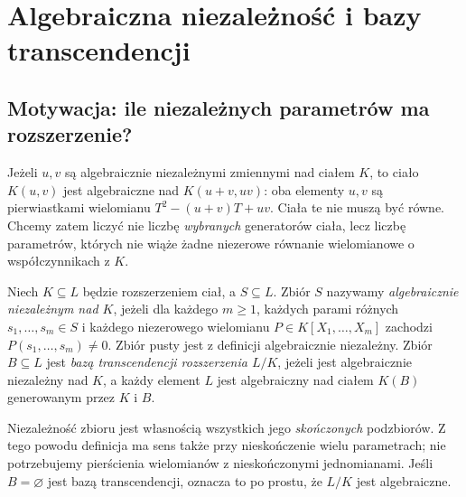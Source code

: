 \chapter{Algebraiczna niezależność i bazy transcendencji}
\label{aa:ch:transcendence}
\section{Motywacja: ile niezależnych parametrów ma rozszerzenie?}
Jeżeli $u,v$ są algebraicznie niezależnymi zmiennymi nad ciałem $K$,
to ciało $K(u,v)$ jest algebraiczne nad $K(u+v,uv)$:
oba elementy $u,v$ są pierwiastkami wielomianu
$T^2-(u+v)T+uv$. Ciała te nie muszą być równe.
Chcemy zatem liczyć nie liczbę \emph{wybranych} generatorów ciała,
lecz liczbę parametrów, których nie wiąże żadne niezerowe
równanie wielomianowe o współczynnikach z $K$.

\begin{definicja}\label{aa:def:alg-independent}
Niech $K\subseteq L$ będzie rozszerzeniem ciał, a $S\subseteq L$.
Zbiór $S$ nazywamy \emph{algebraicznie niezależnym nad $K$},
jeżeli dla każdego $m\ge1$, każdych parami różnych
$s_1,\ldots,s_m\in S$ i każdego niezerowego wielomianu
$P\in K[X_1,\ldots,X_m]$ zachodzi
$P(s_1,\ldots,s_m)\ne0$.
Zbiór pusty jest z definicji algebraicznie niezależny.
Zbiór $B\subseteq L$ jest \emph{bazą transcendencji rozszerzenia $L/K$},
jeżeli jest algebraicznie niezależny nad $K$, a każdy element $L$
jest algebraiczny nad ciałem $K(B)$ generowanym przez $K$ i $B$.
\end{definicja}

\begin{uwaga}
Niezależność zbioru jest własnością wszystkich jego
\emph{skończonych} podzbiorów. Z tego powodu definicja ma sens
także przy nieskończenie wielu parametrach; nie potrzebujemy
pierścienia wielomianów z nieskończonymi jednomianami.
Jeśli $B=\varnothing$ jest bazą transcendencji, oznacza to
po prostu, że $L/K$ jest algebraiczne.
\end{uwaga}

